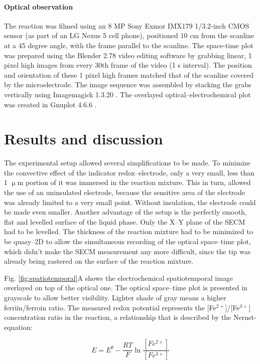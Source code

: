 \documentclass[3p]{elsarticle}
\begin{document}
\paragraph{Optical observation}
The reaction was filmed using an 8 MP Sony Exmor IMX179 1/3.2-inch CMOS sensor (as part of an LG Nexus 5 cell phone), positioned 10 cm from the scanline at a 45 degree angle, with the frame parallel to the scanline.
The space-time plot was prepared using the Blender 2.78 video editing software \cite{blender1} by grabbing linear, 1 pixel high images from every 30th frame of the video (1 s interval).
The position and orientation of these 1 pixel high frames matched that of the scanline covered by the microelectrode.
The image sequence was assembled by stacking the grabs vertically using Imagemagick 1.3.20 \cite{imagemagick}.
The overlayed optical--electrochemical plot was created in Gnuplot 4.6.6 \cite{gnuplot}.

\section{Results and discussion}

The experimental setup allowed several simplifications to be made. To minimize the convective effect of the indicator redox--electrode, only a very small, less than 1 $\upmu$m  portion of it was immersed in the reaction mixture. This in turn, allowed the use of an uninsulated electrode, because the sensitive area of the electrode was already limited to a very small point. Without insulation, the electrode could be made even smaller. Another advantage of the setup is the perfectly smooth, flat and levelled surface of the liquid phase. Only the X--Y plane of the SECM had to be levelled. The thickness of the reaction mixture had to be minimized to be quasy--2D to allow the simultaneous recording of the optical space--time plot, which didn't make the SECM measurement any more difficult, since the tip was already being rastered on the surface of the reaction mixture. 

Fig. \ref{fig:spatiotemporal}A shows the electrochemical spatiotemporal image overlayed on top of the optical one.
The optical space--time plot is presented in grayscale to allow better visibility.
Lighter shade of gray means a higher ferriin/ferroin  ratio.
The measured redox potential represents the [Fe$^{2+}$]/[Fe$^{3+}$]  concentration ratio in the reaction, a relationship that is described by the Nernst-equation:

\begin{equation}
	E = E^\theta - \frac{RT}{F}\ln \frac{[Fe^{2+}]}{[Fe^{3+}]}
\end{equation}
\end{document}
